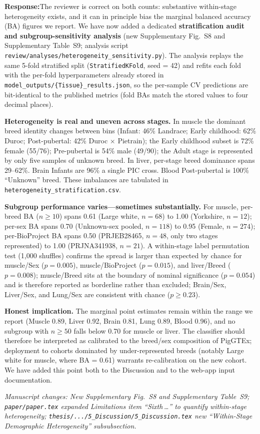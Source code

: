 \documentclass[11pt,a4paper]{article}
\newcommand{\response}[1]{%
  \par\vspace{2pt}\noindent\textbf{\textcolor{respcolor}{Response:}}\;\;#1\par\vspace{6pt}}
\newcommand{\changeloc}[1]{\par\noindent\textit{\small Manuscript changes: #1}\par}
\begin{document}
\response{The reviewer is correct on both counts: substantive within-stage
heterogeneity exists, and it can in principle bias the marginal balanced
accuracy (BA) figures we report. We have now added a dedicated
\textbf{stratification audit and subgroup-sensitivity analysis} (new
Supplementary Fig.~S8 and Supplementary Table~S9; analysis script
\texttt{review/analyses/heterogeneity\_sensitivity.py}). The analysis
replays the same 5-fold stratified split (\texttt{StratifiedKFold},
seed = 42) and refits each fold with the per-fold hyperparameters
already stored in \texttt{model\_outputs/\{Tissue\}\_results.json}, so the
per-sample CV predictions are bit-identical to the published metrics
(fold BAs match the stored values to four decimal places).

\textbf{Heterogeneity is real and uneven across stages.} In muscle the
dominant breed identity changes between bins (Infant: 46\% Landrace;
Early childhood: 62\% Duroc; Post-pubertal: 42\% Duroc $\times$
Pietrain); the Early childhood subset is 72\% female (55/76);
Pre-pubertal is 54\% male (49/90); the Adult stage is represented by
only five samples of unknown breed. In liver, per-stage breed dominance
spans 29--62\%. Brain Infants are 96\% a single PIC cross. Blood
Post-pubertal is 100\% ``Unknown'' breed. These imbalances are tabulated
in \texttt{heterogeneity\_stratification.csv}.

\textbf{Subgroup performance varies---sometimes substantially.} For
muscle, per-breed BA ($n \geq 10$) spans 0.61 (Large white, $n = 68$)
to 1.00 (Yorkshire, $n = 12$); per-sex BA spans 0.70 (Unknown-sex
pooled, $n = 118$) to 0.95 (Female, $n = 274$); per-BioProject BA spans
0.50 (PRJEB28465, $n = 48$, only two stages represented) to 1.00
(PRJNA341938, $n = 21$). A within-stage label permutation test (1{,}000
shuffles) confirms the spread is larger than expected by chance for
muscle/Sex ($p = 0.005$), muscle/BioProject ($p = 0.015$), and
liver/Breed ($p = 0.008$); muscle/Breed sits at the boundary of
nominal significance ($p = 0.054$) and is therefore reported as
borderline rather than excluded; Brain/Sex, Liver/Sex, and Lung/Sex
are consistent with chance ($p \geq 0.23$).

\textbf{Honest implication.} The marginal point estimates remain within
the range we report (Muscle 0.89, Liver 0.92, Brain 0.81, Lung 0.89,
Blood 0.96), and no subgroup with $n \geq 50$ falls below 0.70 for
muscle or liver. The classifier should therefore be interpreted as
calibrated to the breed/sex composition of PigGTEx; deployment to
cohorts dominated by under-represented breeds (notably Large white for
muscle, where BA = 0.61) warrants re-calibration on the new cohort. We
have added this point both to the Discussion and to the web-app input
documentation.}
\changeloc{New Supplementary Fig.~S8 and Supplementary Table~S9;
\texttt{paper/paper.tex} expanded Limitations item ``Sixth\,\ldots'' to
quantify within-stage heterogeneity;
\texttt{thesis/.../5\_Discussion/5\_Discussion.tex} new
``Within-Stage Demographic Heterogeneity'' subsubsection.}
\end{document}
